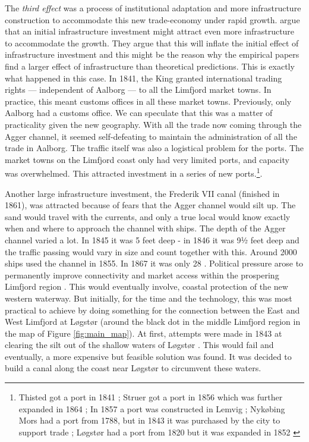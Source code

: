 \documentclass[11pt]{article}
\begin{document}
The \textit{third effect} was a process of institutional adaptation and more infrastructure construction to accommodate this new trade-economy under rapid growth. \cite{Redding2015} argue that an initial infrastructure investment might attract even more infrastructure to accommodate the growth. They argue that this will inflate the initial effect of infrastructure investment and this might be the reason why the empirical papers find a larger effect of infrastructure than theoretical predictions. This is exactly what happened in this case. In 1841, the King granted international trading rights — independent of Aalborg — to all the Limfjord market towns. In practice, this meant customs offices in all these market towns. Previously, only Aalborg had a customs office. We can speculate that this was a matter of practicality given the new geography. With all the trade now coming through the Agger channel, it seemed self-defeating to maintain the administration of all the trade in Aalborg. The traffic itself was also a logistical problem for the ports. The market towns on the Limfjord coast only had very limited ports, and capacity was overwhelmed. This attracted investment in a series of new ports.\footnote{Thisted got a port in 1841 \citep[p. 384-386]{Dioerup1842Thisted}; Struer got a port in 1856 which was further expanded in 1864 \citep[vol V, p. 467]{Trap3}; In 1857 a port was constructed in Lemvig \citep[vol V, p. 474]{Trap3}; Nykøbing Mors had a port from 1788, but in 1843 it was purchased by the city to support trade \citep[vol IV, p. 214]{Trap3}; Løgstør had a port from 1820 but it was expanded in 1852 \citep[vol IV, pp. 399-400]{Trap3}}.

Another large infrastructure investment, the Frederik VII canal (finished in 1861), was attracted because of fears that the Agger channel would silt up. The sand would travel with the currents, and only a true local would know exactly when and where to approach the channel with ships. The depth of the Agger channel varied a lot. In 1845 it was 5 feet deep - in 1846 it was 9½ feet deep \citep{Petersen1877} and the traffic passing would vary in size and count together with this. Around 2000 ships used the channel in 1855. In 1867 it was only 28 \citep{Ravn1993}. Political pressure arose to permanently improve connectivity and market access within the prospering Limfjord region \citep{petersen1853oplysende}. This would eventually involve, coastal protection of the new western waterway. But initially, for the time and the technology, this was most practical to achieve by doing something for the connection between the East and West Limfjord at Løgstør (around the black dot in the middle Limfjord region in the map of Figure \ref{fig:main_map}). At first, attempts were made in 1843 at clearing the silt out of the shallow waters of Løgstør \citep[p. 311][p. 4]{Bergsoee1844, petersen1853oplysende}. This would fail and eventually, a more expensive but feasible solution was found. It was decided to build a canal along the coast near Løgstør to circumvent these waters. 
\end{document}
